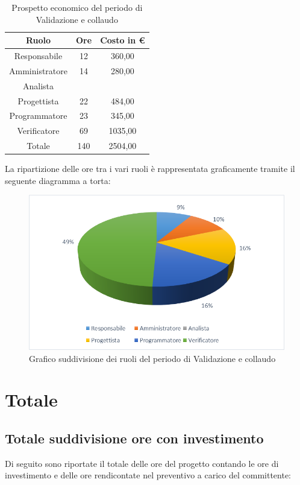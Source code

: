 \documentclass[./PianodiProgetto.tex]{subfiles}
\begin{document}
\begin{table}[H]
	\centering
	\begin{tabular}{|c|c|c|}
		\hline
		Ruolo&Ore&Costo in \euro{} \\ \hline
		Responsabile&12&360,00  \\ \hline
		Amministratore&14&280,00  \\ \hline
		Analista& &  \\ \hline
		Progettista&22&484,00  \\ \hline
		Programmatore&23&345,00  \\ \hline
		Verificatore&69&1035,00  \\ \hline
		Totale&140&2504,00 \\ \hline
	\end{tabular}
	\caption{Prospetto economico del periodo di Validazione e collaudo}
\end{table}

La ripartizione delle ore tra i vari ruoli è rappresentata graficamente tramite il seguente diagramma a torta:

\begin{figure}[H]
	\centering
	\includegraphics[width=1\linewidth]{img/grafici/ValidazioneCollaudoProspettoEconomico}
	\caption{Grafico suddivisione dei ruoli del periodo di Validazione e collaudo}
	\label{fig:validazione-collaudo-prospetto-economico}
\end{figure}

\section{Totale}
\subsection{Totale suddivisione ore con investimento}
Di seguito sono riportate il totale delle ore del progetto contando le ore di investimento e delle ore rendicontate nel preventivo a carico del committente:
\end{document}
